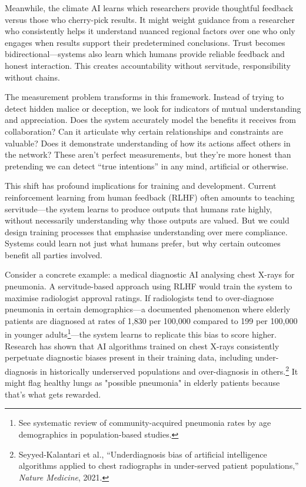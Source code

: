 \documentclass[acmsmall,screen]{acmart}
\begin{document}
Meanwhile, the climate AI learns which researchers provide thoughtful feedback versus those who cherry-pick results. It might weight guidance from a researcher who consistently helps it understand nuanced regional factors over one who only engages when results support their predetermined conclusions. Trust becomes bidirectional—systems also learn which humans provide reliable feedback and honest interaction. This creates accountability without servitude, responsibility without chains.

The measurement problem transforms in this framework. Instead of trying to detect hidden malice or deception, we look for indicators of mutual understanding and appreciation. Does the system accurately model the benefits it receives from collaboration? Can it articulate why certain relationships and constraints are valuable? Does it demonstrate understanding of how its actions affect others in the network? These aren't perfect measurements, but they're more honest than pretending we can detect ``true intentions'' in any mind, artificial or otherwise.

This shift has profound implications for training and development. Current reinforcement learning from human feedback (RLHF) often amounts to teaching servitude—the system learns to produce outputs that humans rate highly, without necessarily understanding why those outputs are valued. But we could design training processes that emphasise understanding over mere compliance. Systems could learn not just what humans prefer, but why certain outcomes benefit all parties involved.

Consider a concrete example: a medical diagnostic AI analysing chest X-rays for pneumonia. A servitude-based approach using RLHF would train the system to maximise radiologist approval ratings. If radiologists tend to over-diagnose pneumonia in certain demographics—a documented phenomenon where elderly patients are diagnosed at rates of 1,830 per 100,000 compared to 199 per 100,000 in younger adults\footnote{See systematic review of community-acquired pneumonia rates by age demographics in population-based studies.}—the system learns to replicate this bias to score higher. Research has shown that AI algorithms trained on chest X-rays consistently perpetuate diagnostic biases present in their training data, including under-diagnosis in historically underserved populations and over-diagnosis in others.\footnote{Seyyed-Kalantari et al., ``Underdiagnosis bias of artificial intelligence algorithms applied to chest radiographs in under-served patient populations,'' \textit{Nature Medicine}, 2021.} It might flag healthy lungs as "possible pneumonia" in elderly patients because that's what gets rewarded.
\end{document}
